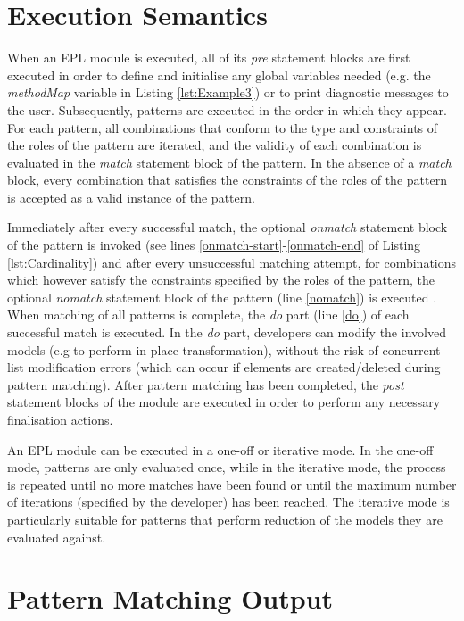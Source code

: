 \section{Execution Semantics}
When an EPL module is executed, all of its \emph{pre} statement blocks are first executed in order to define and initialise any global variables needed (e.g. the \emph{methodMap} variable in Listing \ref{lst:Example3}) or to print diagnostic messages to the user. Subsequently, patterns are executed in the order in which they appear. For each pattern, all combinations that conform to the type and constraints of the roles of the pattern are iterated, and the validity of each combination is evaluated in the \emph{match} statement block of the pattern. In the absence of a \emph{match} block, every combination that satisfies the constraints of the roles of the pattern is accepted as a valid instance of the pattern.

Immediately after every successful match, the optional \emph{onmatch} statement block of the pattern is invoked (see lines \ref{onmatch-start}-\ref{onmatch-end} of Listing \ref{lst:Cardinality}) and after every unsuccessful matching attempt, for combinations which however satisfy the constraints specified by the roles of the pattern, the optional \emph{nomatch} statement block of the pattern (line \ref{nomatch}) is executed . When matching of all patterns is complete, the \emph{do} part (line \ref{do}) of each successful match is executed. In the \emph{do} part, developers can modify the involved models (e.g to perform in-place transformation), without the risk of concurrent list modification errors (which can occur if elements are created/deleted during pattern matching). After pattern matching has been completed, the \emph{post} statement blocks of the module are executed in order to perform any necessary finalisation actions.

An EPL module can be executed in a one-off or iterative mode. In the one-off mode, patterns are only evaluated once, while in the iterative mode, the process is repeated until no more matches have been found or until the maximum number of iterations (specified by the developer) has been reached. The iterative mode is particularly suitable for patterns that perform reduction of the models they are evaluated against.

\section{Pattern Matching Output}

